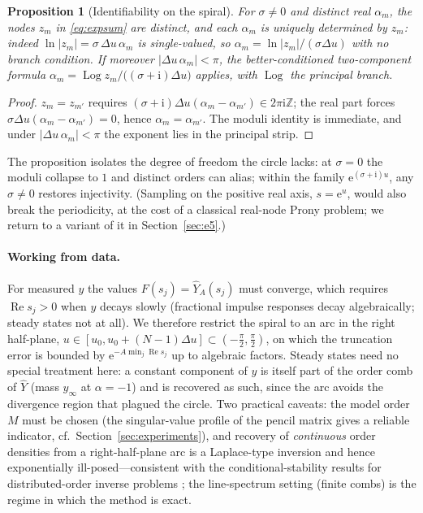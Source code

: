 \documentclass[11pt, a4paper]{article}
\newtheorem{proposition}[theorem]{Proposition}
\theoremstyle{definition}
\theoremstyle{remark}
\newcommand{\Z}{\mathbb{Z}}
\newcommand{\ii}{\mathrm{i}}
\newcommand{\ee}{\mathrm{e}}
\begin{document}
\begin{proposition}[Identifiability on the spiral]\label{prop:injective}
For $\sigma\neq0$ and distinct real $\alpha_m$, the nodes $z_m$ in
\eqref{eq:expsum} are distinct, and each $\alpha_m$ is uniquely determined
by $z_m$: indeed $\ln|z_m|=\sigma\, \Delta u\, \alpha_m$ is single-valued, so
$\alpha_m=\ln|z_m|/(\sigma\Delta u)$ with no branch condition. If moreover
$|\Delta u\, \alpha_m|<\pi$, the better-conditioned two-component formula
$\alpha_m=\operatorname{Log}z_m/\big((\sigma+\ii) \Delta u\big)$ applies,
with $\operatorname{Log}$ the principal branch.
\end{proposition}

\begin{proof}
$z_m=z_{m'}$ requires $(\sigma+\ii)\Delta u(\alpha_m-\alpha_{m'}) \in
2\pi\ii\Z$; the real part forces $\sigma\Delta u(\alpha_m-\alpha_{m'})=0$,
hence $\alpha_m=\alpha_{m'}$. The moduli identity is immediate, and under
$|\Delta u\, \alpha_m|<\pi$ the exponent lies in the principal strip.
\end{proof}

The proposition isolates the degree of freedom the circle lacks: at
$\sigma=0$ the moduli collapse to $1$ and distinct orders can alias; within
the family $\ee^{(\sigma+\ii)u}$, any $\sigma\neq0$ restores injectivity.
(Sampling on the positive real axis, $s=\ee^{u}$, would also break the
periodicity, at the cost of a classical real-node Prony problem; we
return to a variant of it in Section~\ref{sec:e5}.)

\paragraph{Working from data.} For measured $y$ the values
$F(s_j)=\widehat{Y}_{\!A}(s_j)$ must converge, which requires
$\operatorname{Re}s_j>0$ when $y$ decays slowly (fractional impulse
responses decay algebraically; steady states not at all). We therefore
restrict the spiral to an arc in the right half-plane,
$u\in[u_0, u_0+(N-1) \Delta u]\subset(-\tfrac\pi2, \tfrac\pi2)$, on which
the truncation error is bounded by
$\ee^{-A\min_j \operatorname{Re}s_j}$ up to algebraic factors. Steady states
need no special treatment here: a constant component of $y$ is itself part
of the order comb of $\widehat{Y}$ (mass $y_\infty$ at $\alpha=-1$) and is
recovered as such, since the arc avoids the divergence region that plagued
the circle. Two practical caveats: the model order $M$ must be chosen (the
singular-value profile of the pencil matrix gives a reliable indicator, cf.\
Section~\ref{sec:experiments}), and recovery of \emph{continuous} order
densities from a right-half-plane arc is a Laplace-type inversion and hence
exponentially ill-posed---consistent with the conditional-stability results
for distributed-order inverse problems \cite{LiuSunYamamoto2021}; the
line-spectrum setting (finite combs) is the regime in which the method is
exact.
\end{document}

